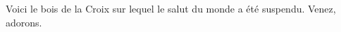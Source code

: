 Voici le bois de la Croix sur lequel le salut du monde a été suspendu.
\versseparator
Venez, adorons.